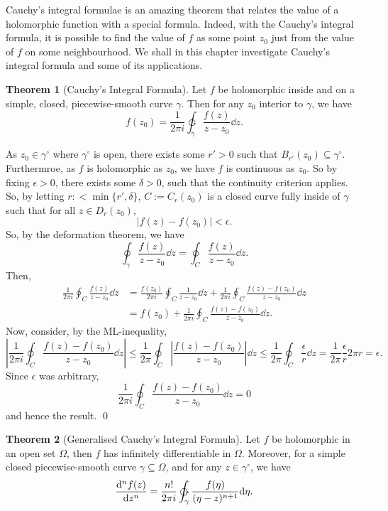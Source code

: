 \documentclass[
]{article}
\theoremstyle{definition}
\newtheorem{theorem}{Theorem}
\theoremstyle{definition}
\begin{document}
Cauchy's integral formulae is an amazing theorem that relates the value
of a holomorphic function with a special formula. Indeed, with the
Cauchy's integral formula, it is possible to find the value of \(f\) as
some point \(z_0\) just from the value of \(f\) on some neighbourhood.
We shall in this chapter investigate Cauchy's integral formula and some
of its applications.

\begin{theorem}[Cauchy's Integral Formula]
  Let \(f\) be holomorphic inside and on a simple, closed, piecewise-smooth 
  curve \(\gamma\). Then for any \(z_0\) interior to \(\gamma\), we have 
  \[f(z_0) = \frac{1}{2\pi i} \ointctrclockwise_\gamma \frac{f(z)}{z - z_0} \dd z.\]
\end{theorem}
\proof

As \(z_0 \in \gamma^\circ\) where \(\gamma^\circ\) is open, there exists
some \(r' > 0\) such that \(B_{r'}(z_0) \subseteq \gamma^\circ\).
Furthermroe, as \(f\) is holomorphic as \(z_0\), we have \(f\) is
continuous as \(z_0\). So by fixing \(\epsilon > 0\), there exists some
\(\delta > 0\), such that the continuity criterion applies. So, by
letting \(r :< \min\{r', \delta\}\), \(C := C_r(z_0)\) is a closed curve
fully inside of \(\gamma\) such that for all \(z \in D_r(z_0)\),
\[| f(z) - f(z_0) | < \epsilon.\] So, by the deformation theorem, we
have
\[\oint_\gamma \frac{f(z)}{z - z_0} \dd z = \oint_C \frac{f(z)}{z - z_0} \dd z.\]
Then, \[\begin{split}
    \frac{1}{2\pi i}\oint_C \frac{f(z)}{z - z_0} \dd z 
      & = \frac{f(z_0)}{2\pi i}\oint_C \frac{1}{z - z_0} \dd z 
        + \frac{1}{2\pi i}\oint_C \frac{f(z) - f(z_0)}{z - z_0} \dd z \\
      & = f(z_0) + \frac{1}{2\pi i}\oint_C \frac{f(z) - f(z_0)}{z - z_0} \dd z.
  \end{split}\] Now, consider, by the ML-inequality,
\[\left| \frac{1}{2\pi i}\oint_C \frac{f(z) - f(z_0)}{z - z_0} \dd z\right|
    \le \frac{1}{2\pi} \oint_C \left| \frac{f(z) - f(z_0)}{z - z_0} \right| \dd z
    \le \frac{1}{2\pi} \oint_C \frac{\epsilon}{r} \dd z
    = \frac{1}{2\pi} \frac{\epsilon}{r} 2\pi r = \epsilon.\] Since
\(\epsilon\) was arbitrary,
\[\frac{1}{2\pi i}\oint_C \frac{f(z) - f(z_0)}{z - z_0} \dd z = 0\] and
hence the result. \qed

\begin{theorem}[Generalised Cauchy's Integral Formula]
  Let \(f\) be holomorphic in an open set \(\Omega\), then \(f\) has infinitely 
  differentiable in \(\Omega\). Moreover, for a simple closed piecewise-smooth 
  curve \(\gamma \subseteq \Omega\), and for any \(z \in \gamma^\circ\), 
  we have 
  \[\dv[n]{f(z)}{z} = \frac{n!}{2\pi i} 
    \ointctrclockwise_\gamma \frac{f(\eta)}{(\eta - z)^{n + 1}}\dd\eta.\]
\end{theorem}
\proof
\end{document}
